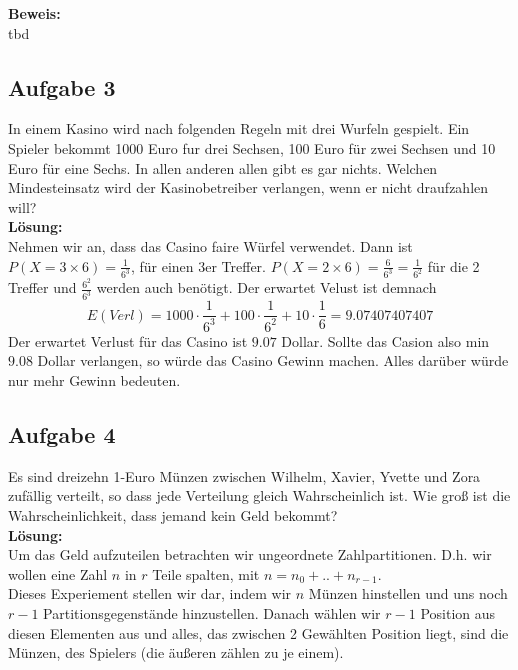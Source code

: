 \documentclass[11pt,a4paper,ngerman]{article}
\begin{document}
\textbf{Beweis:}\\

tbd

\subsection*{Aufgabe 3}

In einem Kasino wird nach folgenden Regeln mit drei Wurfeln gespielt. Ein Spieler
bekommt 1000 Euro fur drei Sechsen, 100 Euro für zwei Sechsen und 10 Euro für
eine Sechs. In allen anderen allen gibt es gar nichts. Welchen Mindesteinsatz wird
der Kasinobetreiber verlangen, wenn er nicht draufzahlen will?\\

\textbf{Lösung:}\\

Nehmen wir an, dass das Casino faire Würfel verwendet. Dann ist
$P( X = 3\times6) = \frac{1}{6^3}$, für einen 3er Treffer. $P( X = 2 \times 6) = \frac{6}{6^3} = \frac{1}{6^2}$ für
die 2 Treffer und $\frac{6^2}{6^3}$ werden auch benötigt. Der erwartet Velust ist demnach
\[
    E(Verl) = 1000 \cdot \frac{1}{6^3} + 100 \cdot \frac{1}{6^2} + 10 \cdot \frac{1}{6} = 9.07407407407
\]
Der erwartet Verlust für das Casino ist $9.07$ Dollar. Sollte das Casion also min $9.08$ Dollar verlangen, so
würde das Casino Gewinn machen. Alles darüber würde nur mehr Gewinn bedeuten.

\subsection*{Aufgabe 4}

Es sind dreizehn 1-Euro Münzen zwischen Wilhelm, Xavier, Yvette und Zora zufällig verteilt, so dass jede Verteilung gleich Wahrscheinlich ist.
Wie groß ist die Wahrscheinlichkeit, dass jemand kein Geld bekommt?\\

\textbf{Lösung:}\\

Um das Geld aufzuteilen betrachten wir ungeordnete Zahlpartitionen. D.h. wir wollen eine Zahl $n$ in $r$ Teile spalten, mit $n = n_0 + .. + n_{r-1}$.\\

Dieses Experiement stellen wir dar, indem wir $n$ Münzen hinstellen und uns noch $r-1$ Partitionsgegenstände hinzustellen. Danach wählen wir $r-1$ Position
aus diesen Elementen aus und alles, das zwischen 2 Gewählten Position liegt, sind die Münzen, des Spielers (die äußeren zählen zu je einem).
\end{document}
